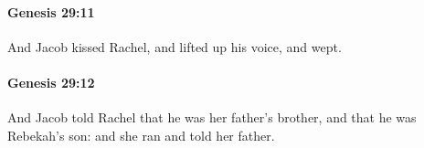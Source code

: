 		\paragraph{Genesis 29:11} %
			\label{GENESIS-29-11}

			And Jacob kissed Rachel, and lifted up his voice, and wept.


		\paragraph{Genesis 29:12} %
			\label{GENESIS-29-12}

			And Jacob told Rachel that he was her father's brother, and that he was Rebekah's son: and she ran and told her father.


